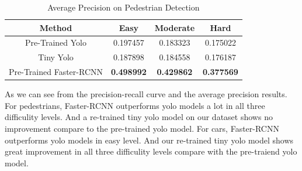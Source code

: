 \begin{table}[h!]
\centering
\begin{tabular}{ c | c | c | c }
\hline
Method & Easy & Moderate & Hard \\
\hline \hline
Pre-Trained Yolo & 0.197457 & 0.183323 & 0.175022 \\
Tiny Yolo & 0.187898 & 0.184558 & 0.176187 \\
Pre-Trained Faster-RCNN & \bfseries 0.498992 & \bfseries 0.429862 & \bfseries 0.377569 \\
\hline
\end{tabular}
\caption{Average Precision on Pedestrian Detection}
\end{table}

As we can see from the precision-recall curve and the average precision results. For pedestrians, Faster-RCNN outperforms yolo models a lot in all three difficulity levels. And a re-trained tiny yolo model on our dataset shows no improvement compare to the pre-trained yolo model. For cars, Faster-RCNN outperforms yolo models in easy level. And our re-trained tiny yolo model shows great improvement in all three difficulity levels compare with the pre-traiend yolo model.
